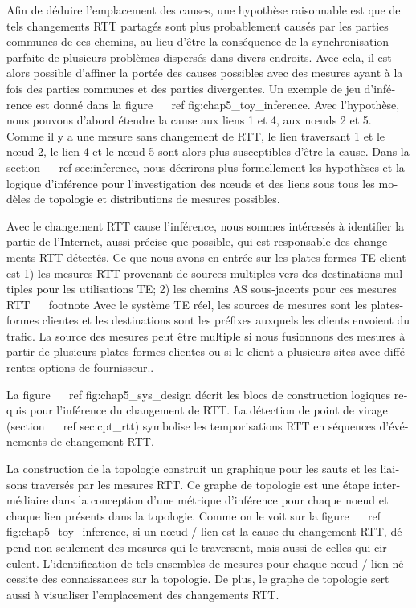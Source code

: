 \begin{otherlanguage}{french}
Afin de déduire l'emplacement des causes, une hypothèse raisonnable est que de tels changements RTT partagés sont plus probablement causés par les parties communes de ces chemins, au lieu d'être la conséquence de la synchronisation parfaite de plusieurs problèmes dispersés dans divers endroits.
Avec cela, il est alors possible d'affiner la portée des causes possibles avec des mesures ayant à la fois des parties communes et des parties divergentes.
Un exemple de jeu d'inférence est donné dans la figure ~ \ ref {fig:chap5_toy_inference}.
Avec l'hypothèse, nous pouvons d'abord étendre la cause aux liens 1 et 4, aux nœuds 2 et 5.
Comme il y a une mesure sans changement de RTT, le lien traversant 1 et le nœud 2, le lien 4 et le nœud 5 sont alors plus susceptibles d'être la cause.
Dans la section ~ \ ref {sec:inference}, nous décrirons plus formellement les hypothèses et la logique d'inférence pour l'investigation des nœuds et des liens sous tous les modèles de topologie et distributions de mesures possibles.

Avec le changement RTT cause l'inférence, nous sommes intéressés à identifier la partie de l'Internet, aussi précise que possible, qui est responsable des changements RTT détectés.
Ce que nous avons en entrée sur les plates-formes TE client est 1) les mesures RTT provenant de sources multiples vers des destinations multiples pour les utilisations TE; 2) les chemins AS sous-jacents pour ces mesures RTT ~ \ footnote {Avec le système TE réel, les sources de mesures sont les plates-formes clientes et les destinations sont les préfixes auxquels les clients envoient du trafic.
La source des mesures peut être multiple si nous fusionnons des mesures à partir de plusieurs plates-formes clientes ou si le client a plusieurs sites avec différentes options de fournisseur.}.

La figure ~ \ ref {fig:chap5_sys_design} décrit les blocs de construction logiques requis pour l'inférence du changement de RTT. La détection de point de virage (section ~ \ ref {sec:cpt_rtt}) symbolise les temporisations RTT en séquences d'événements de changement RTT.

La construction de la topologie construit un graphique pour les sauts et les liaisons traversés par les mesures RTT.
Ce graphe de topologie est une étape intermédiaire dans la conception d'une métrique d'inférence pour chaque noeud et chaque lien présents dans la topologie. Comme on le voit sur la figure ~ \ ref {fig:chap5_toy_inference}, si un nœud / lien est la cause du changement RTT, dépend non seulement des mesures qui le traversent, mais aussi de celles qui circulent. L'identification de tels ensembles de mesures pour chaque nœud / lien nécessite des connaissances sur la topologie. De plus, le graphe de topologie sert aussi à visualiser l'emplacement des changements RTT.


\end{otherlanguage}
